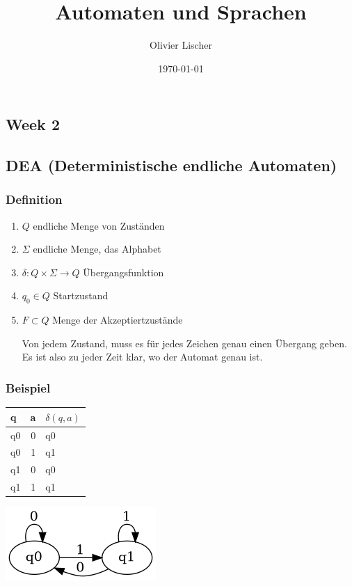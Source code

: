 \documentclass[11pt,twoside,landscape]{article}
\author{Olivier Lischer}
\date{\today}
\title{Automaten und Sprachen}
\begin{document}
\maketitle
\begin{multicols}{2}
\setcounter{tocdepth}{2}
\tableofcontents
\end{multicols}
\newpage

\begin{multicols}{3}
\section{Week 2}
\label{sec:orgca73b96}
\subsection{DEA (Deterministische endliche Automaten)}
\label{sec:orgeeb8294}
\subsubsection*{Definition}
\label{sec:org1a15aa2}
\begin{enumerate}
\item \(Q\) endliche Menge von Zuständen
\item \(\Sigma\) endliche Menge, das Alphabet
\item \(\delta: Q \times \Sigma \to Q\) Übergangsfunktion
\item \(q_0 \in Q\) Startzustand
\item \(F \subset Q\) Menge der Akzeptiertzustände

Von jedem Zustand, muss es für jedes Zeichen genau einen Übergang geben. Es ist also zu jeder Zeit klar, wo der Automat genau ist.
\end{enumerate}
\subsubsection*{Beispiel}
\label{sec:org2c13521}
\begin{center}
\begin{tabular}{lrl}
q & a & \(\delta(q,a)\)\\
\hline
q0 & 0 & q0\\
q0 & 1 & q1\\
q1 & 0 & q0\\
q1 & 1 & q1\\
\end{tabular}
\end{center}

\begin{center}
\includegraphics[width=.9\linewidth]{static/img/autospr/even_binary_dea.png}
\end{center}


\end{multicols}
\end{document}

